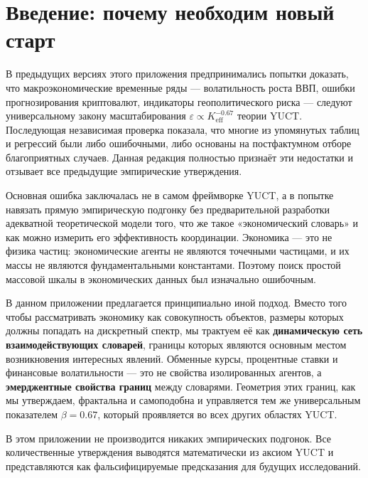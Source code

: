 \documentclass[12pt,a4paper]{article}
\theoremstyle{remark}
\begin{document}
	\tableofcontents
	\newpage
	
	\section{Введение: почему необходим новый старт}
	
	В предыдущих версиях этого приложения предпринимались попытки доказать, что макроэкономические временные ряды — волатильность роста ВВП, ошибки прогнозирования криптовалют, индикаторы геополитического риска — следуют универсальному закону масштабирования \(\varepsilon \propto K_{\mathrm{eff}}^{-0.67}\) теории YUCT. Последующая независимая проверка показала, что многие из упомянутых таблиц и регрессий были либо ошибочными, либо основаны на постфактумном отборе благоприятных случаев. Данная редакция полностью признаёт эти недостатки и отзывает все предыдущие эмпирические утверждения.
	
	Основная ошибка заключалась не в самом фреймворке YUCT, а в попытке навязать прямую эмпирическую подгонку без предварительной разработки адекватной теоретической модели того, что же такое «экономический словарь» и как можно измерить его эффективность координации. Экономика — это не физика частиц: экономические агенты не являются точечными частицами, и их массы не являются фундаментальными константами. Поэтому поиск простой массовой шкалы в экономических данных был изначально ошибочным.
	
	В данном приложении предлагается принципиально иной подход. Вместо того чтобы рассматривать экономику как совокупность объектов, размеры которых должны попадать на дискретный спектр, мы трактуем её как \textbf{динамическую сеть взаимодействующих словарей}, границы которых являются основным местом возникновения интересных явлений. Обменные курсы, процентные ставки и финансовые волатильности — это не свойства изолированных агентов, а \textbf{эмерджентные свойства границ} между словарями. Геометрия этих границ, как мы утверждаем, фрактальна и самоподобна и управляется тем же универсальным показателем \(\beta = 0.67\), который проявляется во всех других областях YUCT.
	
	В этом приложении не производится никаких эмпирических подгонок. Все количественные утверждения выводятся математически из аксиом YUCT и представляются как фальсифицируемые предсказания для будущих исследований.
	
\end{document}
